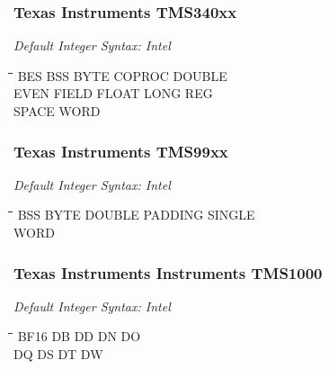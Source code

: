 \subsubsection{Texas Instruments TMS340xx}

{\em Default Integer Syntax: Intel}

{\tt\begin{tabbing}
\hspace{3cm}\=\hspace{3cm}\=\hspace{3cm}\=\hspace{3cm}\=\kill
BES        \> BSS         \> BYTE        \> COPROC      \> DOUBLE \\
EVEN       \> FIELD       \> FLOAT       \> LONG        \> REG \\
SPACE      \> WORD \\
\end{tabbing}}

\subsubsection{Texas Instruments TMS99xx}

{\em Default Integer Syntax: Intel}

{\tt\begin{tabbing}
\hspace{3cm}\=\hspace{3cm}\=\hspace{3cm}\=\hspace{3cm}\=\kill
BSS        \> BYTE        \> DOUBLE      \> PADDING     \> SINGLE \\
WORD \\
\end{tabbing}}

\subsubsection{Texas Instruments Instruments TMS1000}

{\em Default Integer Syntax: Intel}

{\tt\begin{tabbing}
\hspace{3cm}\=\hspace{3cm}\=\hspace{3cm}\=\hspace{3cm}\=\kill
BF16       \> DB          \> DD          \> DN          \> DO \\
DQ         \> DS          \> DT          \> DW \\
\end{tabbing}}

